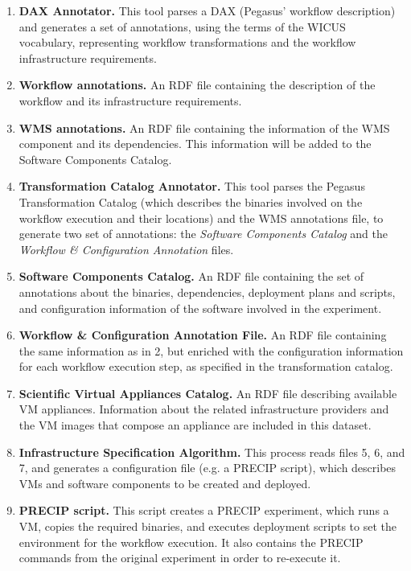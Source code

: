 \documentclass[final,5p,times,twocolumn]{elsarticle}
\begin{document}
\begin{enumerate}
	\item \textbf{DAX Annotator.} This tool parses a DAX (Pegasus' workflow description) and generates a set of annotations, using the terms of the WICUS vocabulary, representing workflow transformations and the workflow infrastructure requirements.

	\item \textbf{Workflow annotations.} An RDF file containing the description of the workflow and its infrastructure requirements.

	\item \textbf{WMS annotations.} An RDF file containing the information of the WMS component and its dependencies. This information will be added to the Software Components Catalog.

	\item \textbf{Transformation Catalog Annotator.} This tool parses the Pegasus Transformation Catalog (which describes the binaries involved on the workflow execution and their locations) and the WMS annotations file, to generate two set of annotations: the \emph{Software Components Catalog} and the \emph{Workflow \& Configuration Annotation} files.

	\item \textbf{Software Components Catalog.} An RDF file containing the set of annotations about the binaries, dependencies, deployment plans and scripts, and configuration information of the software involved in the experiment.

	\item \textbf{Workflow \& Configuration Annotation File.} An RDF file containing the same information as in 2, but enriched with the configuration information for each workflow execution step, as specified in the transformation catalog.

	\item \textbf{Scientific Virtual Appliances Catalog.} An RDF file describing available VM appliances. Information about the related infrastructure providers and the VM images that compose an appliance are included in this dataset.

	\item \textbf{Infrastructure Specification Algorithm.} This process reads files 5, 6, and 7, and generates a configuration file (e.g. a PRECIP script), which describes VMs and software components to be created and deployed.

	\item \textbf{PRECIP script.} This script creates a PRECIP experiment, which runs a VM, copies the required binaries, and executes deployment scripts to set the environment for the workflow execution. It also contains the PRECIP commands from the original experiment in order to re-execute it.

\end{enumerate}
\end{document}

